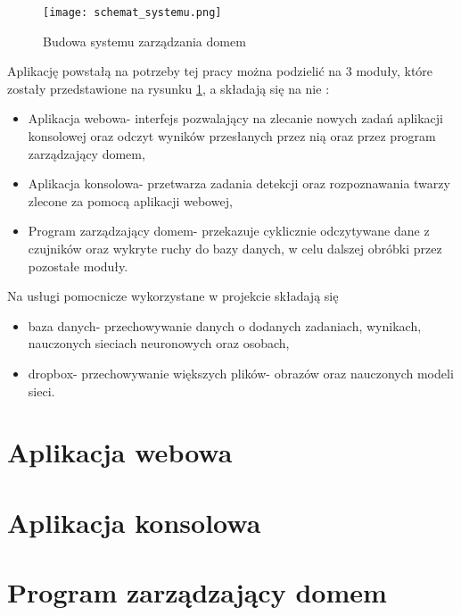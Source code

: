 \begin{figure}[H]
	\centering
	\texttt{[image: schemat\_systemu.png]}
	\caption{Budowa systemu zarządzania domem}
	\label{fig:schemat_systemu}
\end{figure}
Aplikację powstałą na potrzeby tej pracy można podzielić na 3 moduły, które zostały przedstawione na rysunku \ref{fig:schemat_systemu}, a składają się na nie :
\begin{itemize}
\item Aplikacja webowa- interfejs pozwalający na zlecanie nowych zadań aplikacji konsolowej oraz odczyt wyników przesłanych przez nią oraz przez program zarządzający domem,
\item Aplikacja konsolowa- przetwarza zadania detekcji oraz rozpoznawania twarzy zlecone za pomocą aplikacji webowej,
\item Program zarządzający domem- przekazuje cyklicznie odczytywane dane z czujników oraz wykryte ruchy do bazy danych, w celu dalszej obróbki przez pozostałe moduły.
\end{itemize}
Na usługi pomocnicze wykorzystane w projekcie składają się
\begin{itemize}
\item baza danych- przechowywanie danych o dodanych zadaniach, wynikach, nauczonych sieciach neuronowych oraz osobach,
\item dropbox- przechowywanie większych plików- obrazów oraz nauczonych modeli sieci.
\end{itemize}

\section{Aplikacja webowa}
\section{Aplikacja konsolowa}
\section{Program zarządzający domem}
